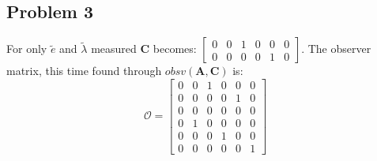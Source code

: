 \subsection{Problem 3}
For only $\tilde{e}$ and $\tilde{\lambda}$ measured $\bm{C}$ becomes:
	$\begin{bmatrix}
    0 & 0 & 1 & 0 & 0 & 0 \\
    0 & 0 & 0 & 0 & 1 & 0
	\end{bmatrix}$.
The observer matrix, this time found through $obsv(\bm{A},\bm{C})$ is:
\begin{equation}
	\bm{\mathcal{O}} =
  \begin{bmatrix}
    0 & 0 & 1 & 0 & 0 & 0 \\
    0 & 0 & 0 & 0 & 1 & 0 \\
    0 & 0 & 0 & 0 & 0 & 0 \\
    0 & 1 & 0 & 0 & 0 & 0 \\
    0 & 0 & 0 & 1 & 0 & 0 \\
    0 & 0 & 0 & 0 & 0 & 1
	\end{bmatrix}
\end{equation}

